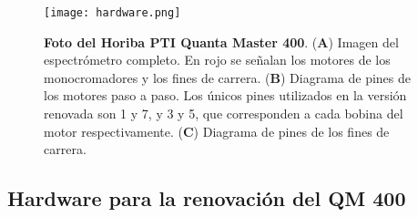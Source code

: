 \begin{figure}[h]
     \centering
     \texttt{[image: hardware.png]}
     \caption{\textbf{Foto del Horiba PTI Quanta Master 400}. 
    (\textbf{A}) Imagen del espectrómetro completo. En rojo se señalan los motores de los monocromadores y los fines de carrera. (\textbf{B}) Diagrama de pines de los motores paso a paso. Los únicos pines utilizados en la versión renovada son 1 y 7, y 3 y 5, que corresponden a cada bobina del motor respectivamente. (\textbf{C}) Diagrama de pines de los fines de carrera.}
     \label{fig:hardware}
\end{figure}



\subsection{Hardware para la renovación del QM 400}

